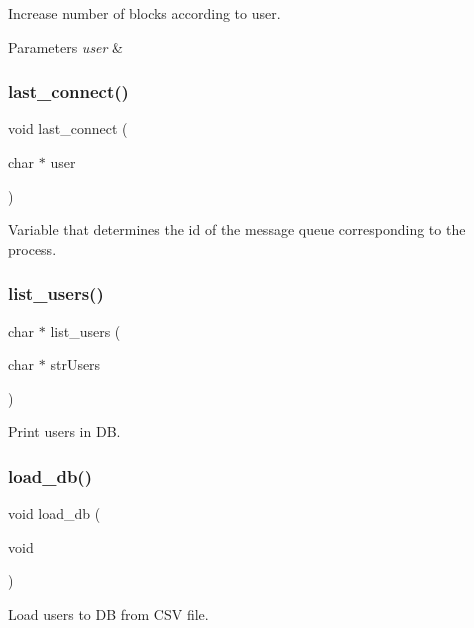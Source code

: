Increase number of blocks according to user. 


\begin{DoxyParams}{Parameters}
{\em user} & \\
\hline
\end{DoxyParams}
\mbox{\label{auth_8c_adedb2d3fe2edbbc0dc8873423f20a23b}} 
\subsubsection{last\+\_\+connect()}
{\footnotesize\ttfamily void last\+\_\+connect (\begin{DoxyParamCaption}\item[{char $\ast$}]{user }\end{DoxyParamCaption})}



Variable that determines the id of the message queue corresponding to the process. 

\mbox{\label{auth_8c_a69300c0cc67b6c288be8ce9547fd8ef8}} 
\subsubsection{list\+\_\+users()}
{\footnotesize\ttfamily char $\ast$ list\+\_\+users (\begin{DoxyParamCaption}\item[{char $\ast$}]{str\+Users }\end{DoxyParamCaption})}



Print users in DB. 

\mbox{\label{auth_8c_a6115e4f2f17d1ecbd69a148fbc06b830}} 
\subsubsection{load\+\_\+db()}
{\footnotesize\ttfamily void load\+\_\+db (\begin{DoxyParamCaption}\item[{void}]{ }\end{DoxyParamCaption})}



Load users to DB from C\+SV file. 

